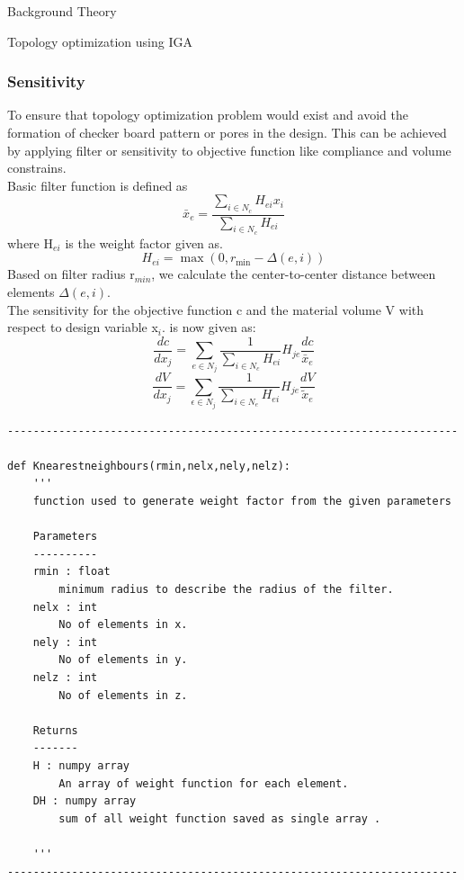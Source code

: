 \documentclass[a4paper,12pt,times]{article}
\begin{document}
\begin{section}{Background Theory}
\begin{subsection}{Topology optimization using IGA}
\subsubsection{Sensitivity}
To ensure that topology optimization problem would exist and avoid the formation of checker board pattern or pores in the design. This can be achieved by applying filter or sensitivity to objective function like compliance and volume constrains.\\
Basic filter function is defined as
\begin{equation}
\bar{x}_{e}=\frac{\sum_{i \in N_{c}} H_{e i} x_{i}}{\sum_{i \in N_{c}} H_{e i}}
\end{equation}
where H$_{e i}$ is the weight factor given as.
 \begin{equation}
H_{e i}=\max \left(0, r_{\min }-\Delta(e, i)\right)
\end{equation}
Based on filter radius r$_{min}$, we calculate the center-to-center distance between elements $\Delta(e, i)$. \\
The sensitivity for
the objective function c and the material volume V with respect to design variable x$_i$.
is now given as:
\begin{equation}
\frac{d c}{d x_{j}}=\sum_{e \in N_{j}} \frac{1}{\sum_{i \in N_{c}} H_{e i}} H_{j e} \frac{d c}{\bar{x}_{e}}
\end{equation}
\begin{equation}
\frac{d V}{d x_{j}}=\sum_{\epsilon \in N_{j}} \frac{1}{\sum_{i \in N_{e}} H_{e i}} H_{j e} \frac{d V}{\tilde{x}_{e}}
\end{equation}
\begin{verbatim}
----------------------------------------------------------------------

def Knearestneighbours(rmin,nelx,nely,nelz):
    '''
    function used to generate weight factor from the given parameters

    Parameters
    ----------
    rmin : float
        minimum radius to describe the radius of the filter.
    nelx : int
        No of elements in x.
    nely : int
        No of elements in y.
    nelz : int
        No of elements in z.

    Returns
    -------
    H : numpy array
        An array of weight function for each element.
    DH : numpy array
        sum of all weight function saved as single array .

    '''
----------------------------------------------------------------------
\end{verbatim}

\end{subsection}
\end{section}
\end{document}
